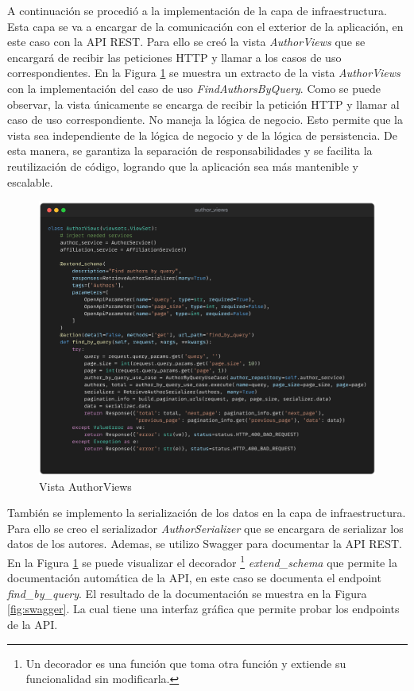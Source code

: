 A continuación se procedió a la implementación de la capa de infraestructura.
Esta capa se va a encargar de la comunicación con el exterior de la aplicación, en este caso con la API REST.
Para ello se creó la vista \textit{AuthorViews} que se encargará de recibir las peticiones HTTP y llamar a los casos de uso correspondientes.
En la Figura \ref{fig:author-views} se muestra un extracto de la vista \textit{AuthorViews} con la implementación del caso de uso \textit{FindAuthorsByQuery}.
Como se puede observar, la vista únicamente se encarga de recibir la petición HTTP y llamar al caso de uso correspondiente. No maneja la lógica de negocio.
Esto permite que la vista sea independiente de la lógica de negocio y de la lógica de persistencia. De esta manera, se garantiza la separación de responsabilidades y se facilita la reutilización de código, logrando que la aplicación sea más mantenible y escalable.
\begin{figure}[H]
    \centering
    \includegraphics[scale=0.085]{../02Figures/02Chapter/Sprints/Sprint-3/author-views.png}
    \caption{Vista AuthorViews}
    \label{fig:author-views}
\end{figure}

También se implemento la serialización de los datos en la capa de infraestructura.
Para ello se creo el serializador \textit{AuthorSerializer} que se encargara de serializar los datos de los autores.
Ademas, se utilizo Swagger para documentar la API REST. En la Figura \ref{fig:author-views} se puede visualizar el decorador \footnote{
    Un decorador es una función que toma otra función y extiende su funcionalidad sin modificarla.} \textit{extend\_schema} que permite la documentación automática de la API, en este caso se documenta el endpoint \textit{find\_by\_query}.
El resultado de la documentación se muestra en la Figura \ref{fig:swagger}. La cual tiene una interfaz gráfica que permite probar los endpoints de la API.

